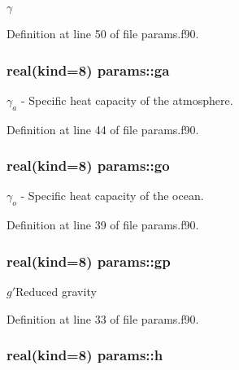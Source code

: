 $\gamma$ 



Definition at line 50 of file params.\-f90.

\hypertarget{classparams_a1c769c8719a62f1a72837b7b9daf8024}{
\subsubsection[{ga}]{\setlength{\rightskip}{0pt plus 5cm}real(kind=8) params\-::ga}}\label{classparams_a1c769c8719a62f1a72837b7b9daf8024}


$\gamma_a$ -\/ Specific heat capacity of the atmosphere. 



Definition at line 44 of file params.\-f90.

\hypertarget{classparams_a30bd914fd64880f5407ebb055e72b88c}{
\subsubsection[{go}]{\setlength{\rightskip}{0pt plus 5cm}real(kind=8) params\-::go}}\label{classparams_a30bd914fd64880f5407ebb055e72b88c}


$\gamma_o$ -\/ Specific heat capacity of the ocean. 



Definition at line 39 of file params.\-f90.

\hypertarget{classparams_a29ba9893360b5685ca584deead6dbc55}{
\subsubsection[{gp}]{\setlength{\rightskip}{0pt plus 5cm}real(kind=8) params\-::gp}}\label{classparams_a29ba9893360b5685ca584deead6dbc55}


$g'$Reduced gravity 



Definition at line 33 of file params.\-f90.

\hypertarget{classparams_a6d9c99d7dfc62518cf51eb98e7f39707}{
\subsubsection[{h}]{\setlength{\rightskip}{0pt plus 5cm}real(kind=8) params\-::h}}\label{classparams_a6d9c99d7dfc62518cf51eb98e7f39707}


